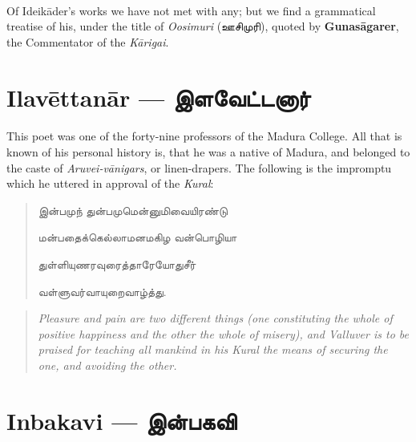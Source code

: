 \documentclass{article}
\newcommand{\TamilText}[1]{\texttamil{#1}}
\newcommand{\TamilBold}[1]{\texttamil{\textbf{#1}}}
\newcommand{\tam}[1]{\TamilText{#1}}
\newcommand{\tambold}[1]{\TamilBold{#1}}
\begin{document}
\paragraph{}
Of Ideik\={a}der's works we have not met with any; but we find a grammatical treatise of his, under the title of \emph{Oosimuri} (\tam{ஊசிமுரி}), quoted by \textbf{Gunas\={a}garer}, the Commentator of the \emph{K\={a}rigai}.

\section{Ilav\={e}ttan\={a}r --- \tambold{இளவேட்டனார்}}
\paragraph{}
This poet was one of the forty-nine professors of the Madura College. All that is known of his personal history is, that he was a native of Madura, and belonged to the caste of \emph{Aruvei-v\={a}nigars}, or linen-drapers. The following is the impromptu which he uttered in approval of the \emph{Kural}:
\begin{quotation}\small
\tam{இன்பமுந் துன்பமுமென்னுமிவையிரண்டு}

\tam{மன்பதைக்கெல்லாமனமகிழ வன்பொழியா}

\tam{துள்ளியுணரவுரைத்தாரேயோதுசீர்‌}

\tam{வள்ளுவர்வாயுறைவாழ்த்து}.
\end{quotation}
\begin{quotation}\small
\emph{Pleasure and pain are two different things (one constituting the whole of positive happiness and the other the whole of misery), and Valluver is to be praised for teaching all mankind in his Kural the means of securing the one, and avoiding the other.}
\end{quotation}

\section{Inbakavi --- \tambold{இன்பகவி}}
\end{document}
